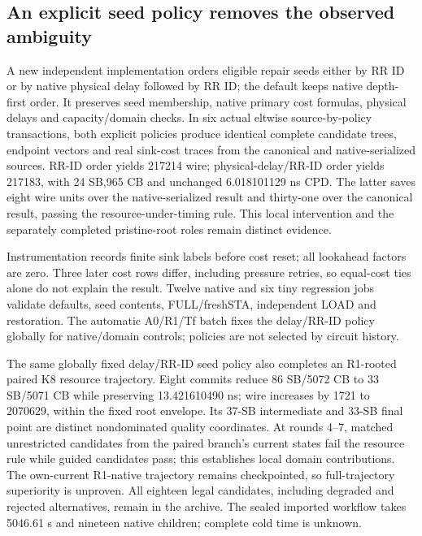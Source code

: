 \documentclass[conference,10pt]{IEEEtran}
\begin{document}
\subsection{An explicit seed policy removes the observed ambiguity}
A new independent implementation orders eligible repair seeds either by RR ID or by native physical delay followed by RR ID; the default keeps native depth-first order. It preserves seed membership, native primary cost formulas, physical delays and capacity/domain checks. In six actual eltwise source-by-policy transactions, both explicit policies produce identical complete candidate trees, endpoint vectors and real sink-cost traces from the canonical and native-serialized sources. RR-ID order yields 217214 wire; physical-delay/RR-ID order yields 217183, with 24 SB,965 CB and unchanged 6.018101129 ns CPD. The latter saves eight wire units over the native-serialized result and thirty-one over the canonical result, passing the resource-under-timing rule. This local intervention and the separately completed pristine-root roles remain distinct evidence.

Instrumentation records finite sink labels before cost reset; all lookahead factors are zero. Three later cost rows differ, including pressure retries, so equal-cost ties alone do not explain the result. Twelve native and six tiny regression jobs validate defaults, seed contents, FULL/freshSTA, independent LOAD and restoration. The automatic A0/R1/Tf batch fixes the delay/RR-ID policy globally for native/domain controls; policies are not selected by circuit history.

The same globally fixed delay/RR-ID seed policy also completes an R1-rooted paired K8 resource trajectory. Eight commits reduce 86 SB/5072 CB to 33 SB/5071 CB while preserving 13.421610490 ns; wire increases by 1721 to 2070629, within the fixed root envelope. Its 37-SB intermediate and 33-SB final point are distinct nondominated quality coordinates. At rounds 4--7, matched unrestricted candidates from the paired branch's current states fail the resource rule while guided candidates pass; this establishes local domain contributions. The own-current R1-native trajectory remains checkpointed, so full-trajectory superiority is unproven. All eighteen legal candidates, including degraded and rejected alternatives, remain in the archive. The sealed imported workflow takes 5046.61 s and nineteen native children; complete cold time is unknown.
\end{document}
